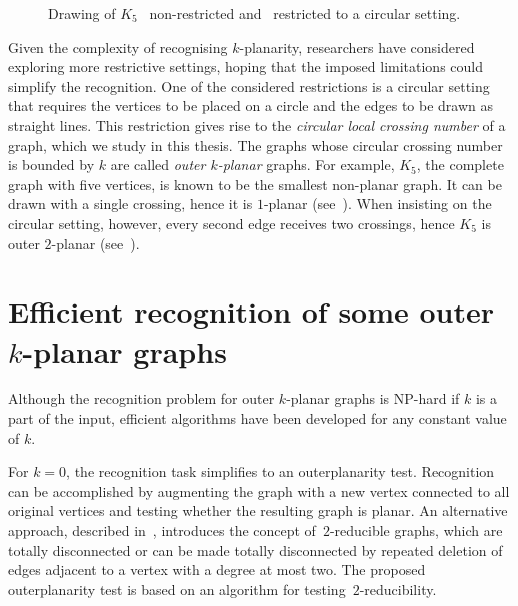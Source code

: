 \begin{figure}[tbh]
    \centering
    \captionsetup{subrefformat=parens}
    \caption{Drawing of \(K_5\) ~non-restricted and ~restricted to a circular setting.}
    \label{fig:figure}
\end{figure}

Given the complexity of recognising \(k\)-planarity, researchers have considered exploring more restrictive settings, hoping that the imposed limitations could simplify the recognition. One of the considered restrictions is a circular setting that requires the vertices to be placed on a circle and the edges to be drawn as straight lines. This restriction gives rise to the \emph{circular local crossing number} of a graph, which we study in this thesis. The graphs whose circular crossing number is bounded by \(k\) are called \emph{outer \(k\)-planar} graphs. For example, \(K_5\), the complete graph with five vertices, is known to be the smallest non-planar graph. It can be drawn with a single crossing, hence it is \(1\)-planar (see~). When insisting on the circular setting, however, every second edge receives two crossings, hence \(K_5\) is outer \(2\)-planar (see~).


\section{Efficient recognition of some outer \texorpdfstring{\(k\)}{k}-planar graphs}

Although the recognition problem for outer \(k\)-planar graphs is NP-hard if \(k\) is a part of the input, efficient algorithms have been developed for any constant value of \(k\).

For \(k = 0\), the recognition task simplifies to an outerplanarity test. Recognition can be accomplished by augmenting the graph with a new vertex connected to all original vertices and testing whether the resulting graph is planar. An alternative approach, described in~\cite{linear-op}, introduces the concept of~\(2\)-reducible graphs, which are totally disconnected or can be made totally disconnected by repeated deletion of edges adjacent to a vertex with a degree at most two. The proposed outerplanarity test is based on an algorithm for testing~\(2\)-reducibility.

